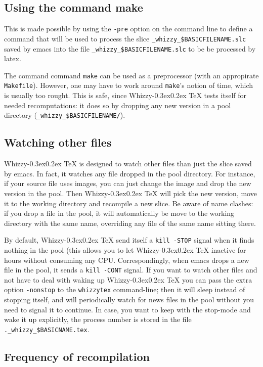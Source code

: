 \documentclass{article}
\let \lst \verb
\def \whizzy{{Whizzy\kern -0.3ex\raise 0.2ex \hbox{\TeX}}}
\begin{document}
\subsection {Using the command make} 
\label {make}

This is made possible by using the \lst"-pre" option on the command line
to  define a command that will be used to process the slice 
\lst"_whizzy_$BASICFILENAME.slc" saved by emacs
into the file \lst"_whizzy_$BASICFILENAME.slc" to be be processed 
by latex.

The command command \lst"make" can be used as a preprocessor (with an
appropirate \lst"Makefile").  However, one may have to work around
\lst"make"'s notion of time, which is usually too rought. 
This is safe, since
{\whizzy} tests itself for needed recomputations: it does so by dropping any
new version in a pool directory (\lst"_whizzy_$BASICFILENAME/"). 

\subsection {Watching other files}

{\whizzy} is designed to watch other files than just the slice saved by
emacs. In fact, it watches any file dropped in the pool directory. 
For instance, 
if your source file uses images, you can just change the image and
drop the new version in the pool. Then {\whizzy} will pick the new version,
move it to the working directory and recompile a new slice. Be aware of name
clashes: if you drop a file in the pool, it will automatically be move to
the working directory with the same name, overriding any file of the same
name sitting there. 

By default, {\whizzy} send itself a \lst"kill -STOP" signal when it finds
nothing in the pool (this allows you to let {\whizzy} inactive for hours
without consuming any CPU. Correspondingly, when emacs drops a new file in
the pool, it sends a \lst"kill -CONT" signal. If you want to watch other
files and not have to deal with waking up {\whizzy} you can pass the extra
option \lst"-nonstop" to the \lst"whizzytex" command-line; then it will sleep
instead of stopping itself, and will periodically watch for news files 
in the pool without you need to signal it to continue. 
In case, you want to keep with the stop-mode and wake it up explicitly, the
process number is stored in the file \lst"._whizzy_$BASICNAME.tex".


\subsection {Frequency of recompilation} 
\end{document}
